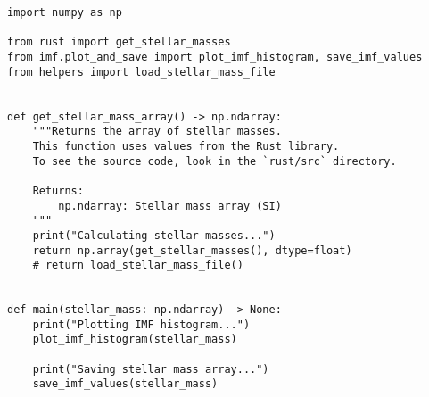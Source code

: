 \begin{lstlisting}
import numpy as np

from rust import get_stellar_masses
from imf.plot_and_save import plot_imf_histogram, save_imf_values
from helpers import load_stellar_mass_file


def get_stellar_mass_array() -> np.ndarray:
    """Returns the array of stellar masses.
    This function uses values from the Rust library.
    To see the source code, look in the `rust/src` directory.

    Returns:
        np.ndarray: Stellar mass array (SI)
    """
    print("Calculating stellar masses...")
    return np.array(get_stellar_masses(), dtype=float)
    # return load_stellar_mass_file()


def main(stellar_mass: np.ndarray) -> None:
    print("Plotting IMF histogram...")
    plot_imf_histogram(stellar_mass)

    print("Saving stellar mass array...")
    save_imf_values(stellar_mass)
\end{lstlisting}